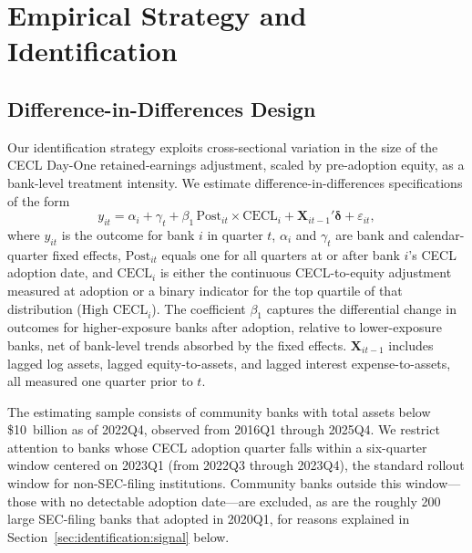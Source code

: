 
\section{Empirical Strategy and Identification}
\label{sec:identification}

\subsection{Difference-in-Differences Design}
\label{sec:identification:did}

Our identification strategy exploits cross-sectional variation in the size of
the CECL Day-One retained-earnings adjustment, scaled by pre-adoption equity, as
a bank-level treatment intensity. We estimate difference-in-differences
specifications of the form
\begin{equation}
  y_{it} = \alpha_i + \gamma_t + \beta_1 \, \text{Post}_{it} \times \text{CECL}_i
  + \mathbf{X}_{it-1}'\boldsymbol{\delta} + \varepsilon_{it},
  \label{eq:did}
\end{equation}
where $y_{it}$ is the outcome for bank $i$ in quarter $t$, $\alpha_i$ and
$\gamma_t$ are bank and calendar-quarter fixed effects, $\text{Post}_{it}$
equals one for all quarters at or after bank $i$'s CECL adoption date, and
$\text{CECL}_i$ is either the continuous CECL-to-equity adjustment measured at
adoption or a binary indicator for the top quartile of that distribution
($\text{High CECL}_i$). The coefficient $\beta_1$ captures the differential
change in outcomes for higher-exposure banks after adoption, relative to
lower-exposure banks, net of bank-level trends absorbed by the fixed effects.
$\mathbf{X}_{it-1}$ includes lagged log assets, lagged equity-to-assets, and
lagged interest expense-to-assets, all measured one quarter prior to $t$.

The estimating sample consists of community banks with total assets below
\$10~billion as of 2022Q4, observed from 2016Q1 through 2025Q4. We restrict
attention to banks whose CECL adoption quarter falls within a six-quarter window
centered on 2023Q1 (from 2022Q3 through 2023Q4), the standard rollout window for
non-SEC-filing institutions. Community banks outside this window---those with no
detectable adoption date---are excluded, as are the roughly 200 large SEC-filing
banks that adopted in 2020Q1, for reasons explained in
Section~\ref{sec:identification:signal} below.

